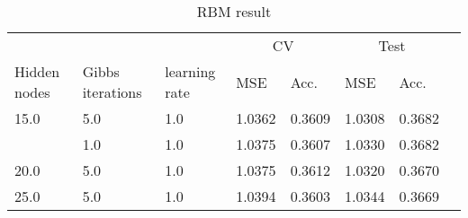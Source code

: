 \begin{table}
\centering
\caption{RBM result}
\label{tab:results.rbm}
\begin{tabular}{llllllll}
\toprule
     &     &      & \multicolumn{2}{c}{CV} & \multicolumn{2}{c}{Test}\\
     \cmidrule(lr){4-5}\cmidrule(lr){6-7}
Hidden nodes & Gibbs iterations  & learning rate &    MSE & Acc. & MSE & Acc.  \\
\midrule
15.0 & 5.0 & 1.0 &   1.0362 &      0.3609 &   1.0308 &        0.3682 \\
     & 1.0 & 1.0 &   1.0375 &      0.3607 &   1.0330 &        0.3682 \\
20.0 & 5.0 & 1.0 &   1.0375 &      0.3612 &   1.0320 &        0.3670 \\
25.0 & 5.0 & 1.0 &   1.0394 &      0.3603 &   1.0344 &        0.3669 \\
\bottomrule
\end{tabular}
\end{table}
